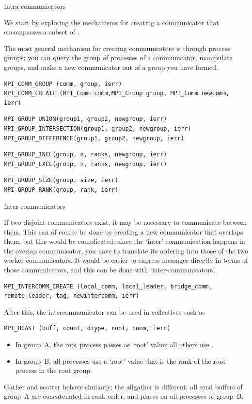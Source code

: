  {Intra-communicators}
\label{sec:comm-group}

We start by exploring the mechanisms for creating a communicator that
encompasses a subset of . 

The most general mechanism for creating communicators is through
process groups: you can query the group of processes of a
communicator, manipulate groups, and make a new communicator out of a
group you have formed.

\begin{verbatim}
MPI_COMM_GROUP (comm, group, ierr)
MPI_COMM_CREATE (MPI_Comm comm,MPI_Group group, MPI_Comm newcomm, ierr)
\end{verbatim}

\begin{verbatim}
MPI_GROUP_UNION(group1, group2, newgroup, ierr)
MPI_GROUP_INTERSECTION(group1, group2, newgroup, ierr)
MPI_GROUP_DIFFERENCE(group1, group2, newgroup, ierr)
\end{verbatim}

\begin{verbatim}
MPI_GROUP_INCL(group, n, ranks, newgroup, ierr)
MPI_GROUP_EXCL(group, n, ranks, newgroup, ierr)
\end{verbatim}
\begin{verbatim}
MPI_GROUP_SIZE(group, size, ierr)
MPI_GROUP_RANK(group, rank, ierr)
\end{verbatim}

 {Inter-communicators}

If two disjoint communicators exist, it may be necessary to
communicate between them. This can of course be done by creating a new
communicator that overlaps them, but this would be complicated: since
the `inter' communication happens in the overlap communicator, you
have to translate its ordering into those of the two worker
communicators. It would be easier to express messages directly in
terms of those communicators, and this can be done with
`inter-communicators'.

\begin{verbatim}
MPI_INTERCOMM_CREATE (local_comm, local_leader, bridge_comm, remote_leader, tag, newintercomm, ierr)
\end{verbatim}
After this, the intercommunicator can be used in collectives such as
\begin{verbatim}
MPI_BCAST (buff, count, dtype, root, comm, ierr)
\end{verbatim}
\begin{itemize}
\item In group~A, the root process passes  as
  `root' value; all others use .
\item In group~B, all processes use a `root' value that is the
  rank of the root process in the root group.
\end{itemize}
Gather and scatter behave similarly; the allgather is different: all
send buffers of group~A are concatenated in rank order, and places on
all processes of group~B.

